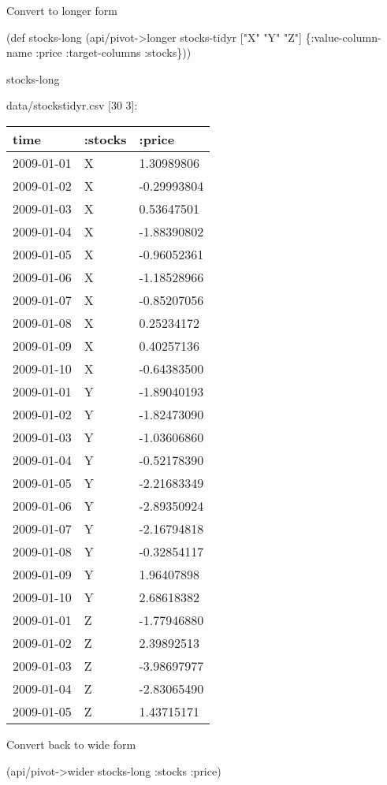 \documentclass[]{article}
\newenvironment{Shaded}{\begin{snugshade}}{\end{snugshade}}
\newcommand{\AttributeTok}[1]{\textcolor[rgb]{0.77,0.63,0.00}{#1}}
\newcommand{\BuiltInTok}[1]{#1}
\newcommand{\FunctionTok}[1]{\textcolor[rgb]{0.00,0.00,0.00}{#1}}
\newcommand{\NormalTok}[1]{#1}
\newcommand{\StringTok}[1]{\textcolor[rgb]{0.31,0.60,0.02}{#1}}
\begin{document}
Convert to longer form

\begin{Shaded}
\begin{Highlighting}[]
\NormalTok{(}\BuiltInTok{def}\FunctionTok{ stocks-long }\NormalTok{(api/pivot->longer stocks-tidyr [}\StringTok{"X"} \StringTok{"Y"} \StringTok{"Z"}\NormalTok{] \{}\AttributeTok{:value-column-name} \AttributeTok{:price}
                                                                \AttributeTok{:target-columns} \AttributeTok{:stocks}\NormalTok{\}))}
\end{Highlighting}
\end{Shaded}

\begin{Shaded}
\begin{Highlighting}[]
\NormalTok{stocks-long}
\end{Highlighting}
\end{Shaded}

data/stockstidyr.csv {[}30 3{]}:

\begin{longtable}[]{@{}lll@{}}
\toprule
time & :stocks & :price\tabularnewline
\midrule
\endhead
2009-01-01 & X & 1.30989806\tabularnewline
2009-01-02 & X & -0.29993804\tabularnewline
2009-01-03 & X & 0.53647501\tabularnewline
2009-01-04 & X & -1.88390802\tabularnewline
2009-01-05 & X & -0.96052361\tabularnewline
2009-01-06 & X & -1.18528966\tabularnewline
2009-01-07 & X & -0.85207056\tabularnewline
2009-01-08 & X & 0.25234172\tabularnewline
2009-01-09 & X & 0.40257136\tabularnewline
2009-01-10 & X & -0.64383500\tabularnewline
2009-01-01 & Y & -1.89040193\tabularnewline
2009-01-02 & Y & -1.82473090\tabularnewline
2009-01-03 & Y & -1.03606860\tabularnewline
2009-01-04 & Y & -0.52178390\tabularnewline
2009-01-05 & Y & -2.21683349\tabularnewline
2009-01-06 & Y & -2.89350924\tabularnewline
2009-01-07 & Y & -2.16794818\tabularnewline
2009-01-08 & Y & -0.32854117\tabularnewline
2009-01-09 & Y & 1.96407898\tabularnewline
2009-01-10 & Y & 2.68618382\tabularnewline
2009-01-01 & Z & -1.77946880\tabularnewline
2009-01-02 & Z & 2.39892513\tabularnewline
2009-01-03 & Z & -3.98697977\tabularnewline
2009-01-04 & Z & -2.83065490\tabularnewline
2009-01-05 & Z & 1.43715171\tabularnewline
\bottomrule
\end{longtable}

Convert back to wide form

\begin{Shaded}
\begin{Highlighting}[]
\NormalTok{(api/pivot->wider stocks-long }\AttributeTok{:stocks} \AttributeTok{:price}\NormalTok{)}
\end{Highlighting}
\end{Shaded}
\end{document}
